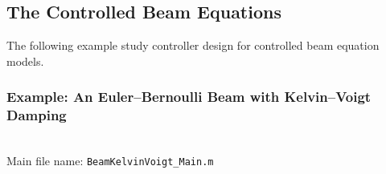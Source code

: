 \documentclass[11pt, a4paper]{amsart}
\newcommand{\COMMapproxRC}[1]{{\color{gray}#1}}
\renewcommand{\COMMapproxRC}[1]{}
\theoremstyle{definition}
\numberwithin{equation}{section}
\begin{document}
%
%

\subsection{The Controlled Beam Equations}
\label{sec:ControlledBeams}


The following example study controller design for controlled beam equation models.


\medskip

\subsubsection*{Example: An Euler--Bernoulli Beam with Kelvin--Voigt Damping}
~\\[-1ex]

\noindent Main file name: \texttt{BeamKelvinVoigt\_Main.m}

\medskip
\end{document}
